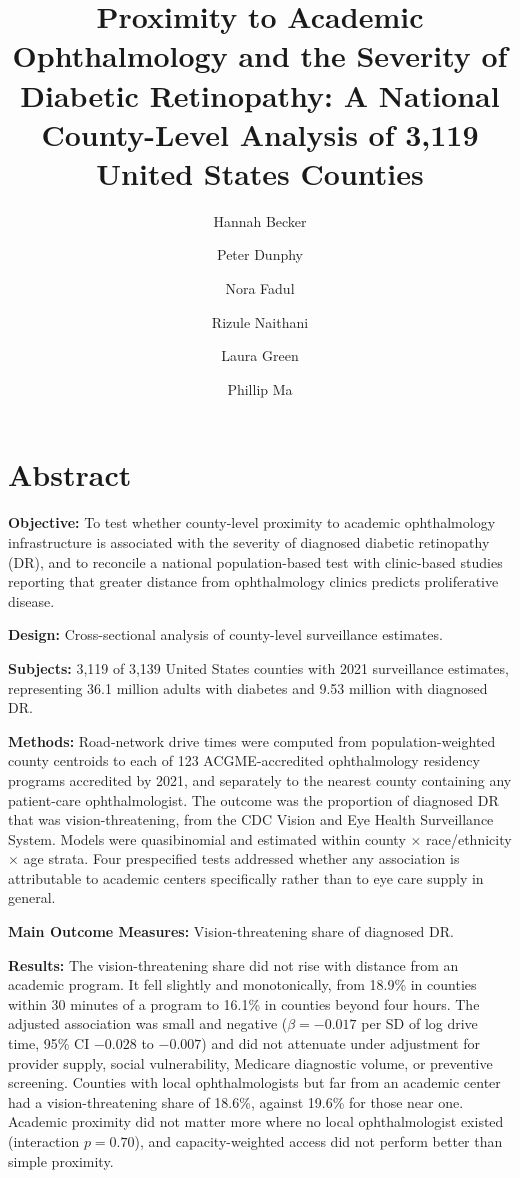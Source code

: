 \documentclass[11pt]{article}
\title{\textbf{Proximity to Academic Ophthalmology and the Severity of
Diabetic Retinopathy: A National County-Level Analysis of 3,119 United States
Counties}}
\author[1]{Hannah Becker}
\author[4]{Peter Dunphy}
\author[1]{Nora Fadul}
\author[1]{Rizule Naithani}
\author[1,3]{Laura Green}
\author[2]{Phillip Ma}
\affil[1]{George Washington University School of Medicine and Health Sciences,
Department of Ophthalmology}
\affil[2]{George Washington University, Milken Institute School of Public Health}
\affil[3]{Krieger Eye Institute, Sinai Hospital of Baltimore}
\affil[4]{University of Texas at Austin, Department of Government}
\date{}
\begin{document}
\maketitle

\section*{Abstract}

\noindent\textbf{Objective:} To test whether county-level proximity to
academic ophthalmology infrastructure is associated with the severity of
diagnosed diabetic retinopathy (DR), and to reconcile a national
population-based test with clinic-based studies reporting that greater distance
from ophthalmology clinics predicts proliferative disease.

\noindent\textbf{Design:} Cross-sectional analysis of county-level surveillance
estimates.

\noindent\textbf{Subjects:} 3,119 of 3,139 United States counties with 2021 surveillance
estimates, representing 36.1 million adults with diabetes and 9.53 million with
diagnosed DR.

\noindent\textbf{Methods:} Road-network drive times were computed from
population-weighted county centroids to each of 123 ACGME-accredited
ophthalmology residency programs accredited by 2021, and separately to the
nearest county containing any patient-care ophthalmologist. The outcome was the
proportion of diagnosed DR that was vision-threatening, from the CDC Vision and
Eye Health Surveillance System. Models were quasibinomial and estimated within
county $\times$ race/ethnicity $\times$ age strata. Four prespecified tests
addressed whether any association is attributable to academic centers
specifically rather than to eye care supply in general.

\noindent\textbf{Main Outcome Measures:} Vision-threatening share of diagnosed
DR.

\noindent\textbf{Results:} The vision-threatening share did not rise with
distance from an academic program. It fell slightly and monotonically, from
18.9\% in counties within 30 minutes of a program to 16.1\% in counties beyond
four hours. The adjusted association was small and negative
($\beta = -0.017$ per SD of log drive time, 95\% CI $-0.028$ to $-0.007$) and did not attenuate
under adjustment for provider supply, social vulnerability, Medicare diagnostic
volume, or preventive screening. Counties with local ophthalmologists but far
from an academic center had a vision-threatening share of 18.6\%, against 19.6\%
for those near one. Academic proximity did not matter more where no local
ophthalmologist existed (interaction $p = 0.70$), and capacity-weighted access
did not perform better than simple proximity.
\end{document}
